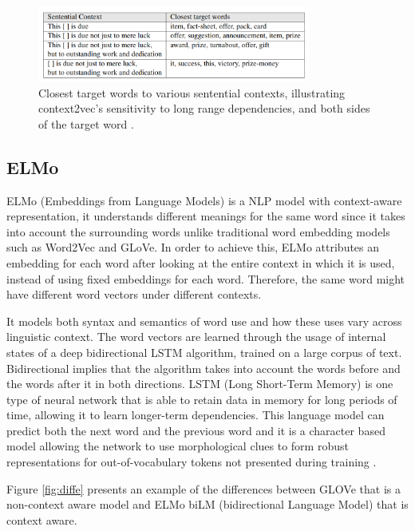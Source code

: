             \begin{figure}[H]
                \centering
                \captionsetup{justification=centering}
                \includegraphics[width=0.8\textwidth]{Sections/3StateOfTheArt/3_images/context2vec_predict.png}
                \caption[Context2vec's closest target words]{Closest target words to various sentential contexts, illustrating context2vec’s sensitivity to long range dependencies, and both sides of the target word \cite{Melamud2016}.} 
            \end{figure}
            
        

        \subsection{ELMo}

            \par ELMo (Embeddings from Language Models) is a NLP model with context-aware representation, it understands different meanings for the same word since it takes into account the surrounding words unlike traditional word embedding models such as Word2Vec and GLoVe. In order to achieve this, ELMo attributes an embedding for each word after looking at the entire context in which it is used, instead of using fixed embeddings for each word. Therefore, the same word might have different word vectors under different contexts.
            \par It models both syntax and semantics of word use and how these uses vary across linguistic context. The word vectors are learned through the usage of internal states of a deep bidirectional LSTM algorithm, trained on a large corpus of text. Bidirectional implies that the algorithm takes into account the words before and the words after it in both directions. LSTM (Long Short-Term Memory) is one type of neural network that is able to retain data in memory for long periods of time, allowing it to learn longer-term dependencies.
            This language model can predict both the next word and the previous word and it is a character based model allowing the network to use morphological clues to form robust representations for out-of-vocabulary tokens not presented during training \cite{Peters:2018}.
            \par Figure \ref{fig:diffe} presents an example of the differences between GLOVe that is a non-context aware model and ELMo biLM (bidirectional Language Model) that is context aware.

